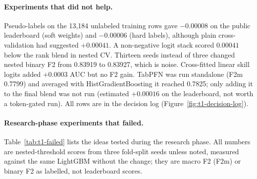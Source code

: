 \documentclass[../main.tex]{subfiles}
\begin{document}
\paragraph{Experiments that did not help.} Pseudo-labels on the 13,184 unlabeled training rows gave $-0.00008$ on the public leaderboard (soft weights) and $-0.00006$ (hard labels), although plain cross-validation had suggested $+0.00041$. A non-negative logit stack scored $0.00041$ below the rank blend in nested CV. Thirteen seeds instead of three changed nested binary F2 from 0.83919 to 0.83927, which is noise. Cross-fitted linear skill logits added $+0.0003$ AUC but no F2 gain. TabPFN \citep{tabpfn} was run standalone (F2m 0.7799) and averaged with HistGradientBoosting it reached 0.7825; only adding it to the final blend was not run (estimated $+0.00016$ on the leaderboard, not worth a token-gated run). All rows are in the decision log (Figure~\ref{fig:t1-decision-log}).

\paragraph{Research-phase experiments that failed.} Table~\ref{tab:t1-failed} lists the ideas tested during the research phase. All numbers are nested-threshold scores from three fold-split seeds unless noted, measured against the same LightGBM without the change; they are macro F2 (F2m) or binary F2 as labelled, not leaderboard scores.
\end{document}
